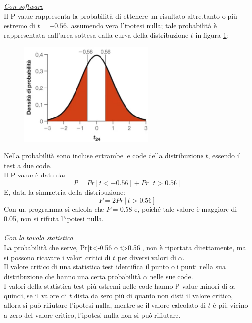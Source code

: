 \documentclass[10pt, draft]{book}
\newcounter{example}[section]
\begin{document}
\begin{example}
    \\
    \\
    \underline{\textit{Con software}}
    \\
    Il P-value rappresenta la probabilità di ottenere un risultato altrettanto o più estremo di $t=-0.56$, assumendo vera l'ipotesi nulla; tale probabilità è rappresentata dall'area sottesa dalla curva della distribuzione $t$ in figura \ref{fig11.3-2}:
    \begin{figure}[H]\label{fig11.3-2}
        \centering
        \includegraphics[width=0.6\textwidth]{fig11.3-2}
        \caption{\small{}}
    \end{figure}
    Nella probabilità sono incluse entrambe le code della distribuzione $t$, essendo il test a due code.
    \\
    Il P-value è dato da:
    \begin{equation}
        P = Pr[t<-0.56]+Pr[t>0.56]
    \end{equation}
    E, data la simmetria della distribuzione:
    \begin{equation}
        P = 2Pr[t>0.56]
    \end{equation}
    Con un programma si calcola che $P = 0.58$ e, poiché tale valore è maggiore di 0.05, non si rifiuta l'ipotesi nulla.
    \\
    \\
    \underline{\textit{Con la tavola statistica}}
    \\
    La probabilità che serve, Pr[t<-0.56 o t>0.56], non è riportata direttamente, ma si possono ricavare i valori critici di $t$ per diversi valori di $\alpha$. 
    \\
    Il valore critico di una statistica test identifica il punto o i punti nella sua distribuzione che hanno una certa probabilità $\alpha$ nelle sue code.
    \\
    I valori della statistica test più estremi nelle code hanno P-value minori di $\alpha$, quindi, se il valore di $t$ dista da zero più di quanto non disti il valore critico, allora si può rifiutare l'ipotesi nulla, mentre se il valore calcolato di $t$ è più vicino a zero del valore critico, l'ipotesi nulla non si può rifiutare.

\end{example}
\end{document}
